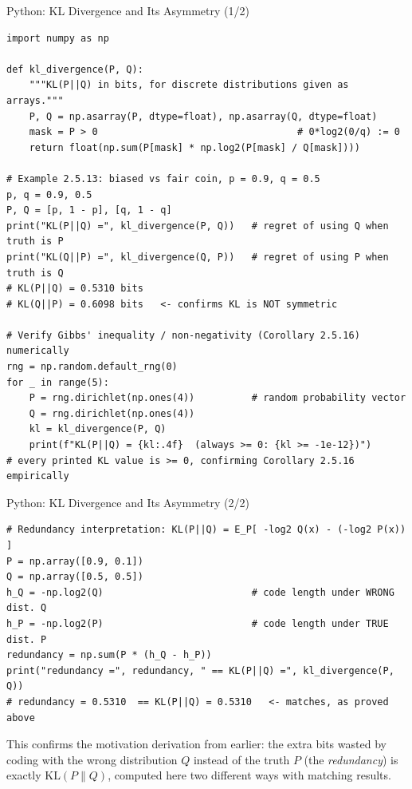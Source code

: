 \documentclass[aspectratio=169,10pt]{beamer}
\begin{document}
\begin{frame}[fragile]{Python: KL Divergence and Its Asymmetry (1/2)}
\begin{lstlisting}[style=python]
import numpy as np

def kl_divergence(P, Q):
    """KL(P||Q) in bits, for discrete distributions given as arrays."""
    P, Q = np.asarray(P, dtype=float), np.asarray(Q, dtype=float)
    mask = P > 0                                   # 0*log2(0/q) := 0
    return float(np.sum(P[mask] * np.log2(P[mask] / Q[mask])))

# Example 2.5.13: biased vs fair coin, p = 0.9, q = 0.5
p, q = 0.9, 0.5
P, Q = [p, 1 - p], [q, 1 - q]
print("KL(P||Q) =", kl_divergence(P, Q))   # regret of using Q when truth is P
print("KL(Q||P) =", kl_divergence(Q, P))   # regret of using P when truth is Q
# KL(P||Q) = 0.5310 bits
# KL(Q||P) = 0.6098 bits   <- confirms KL is NOT symmetric

# Verify Gibbs' inequality / non-negativity (Corollary 2.5.16) numerically
rng = np.random.default_rng(0)
for _ in range(5):
    P = rng.dirichlet(np.ones(4))          # random probability vector
    Q = rng.dirichlet(np.ones(4))
    kl = kl_divergence(P, Q)
    print(f"KL(P||Q) = {kl:.4f}  (always >= 0: {kl >= -1e-12})")
# every printed KL value is >= 0, confirming Corollary 2.5.16 empirically
\end{lstlisting}
\end{frame}

\begin{frame}[fragile]{Python: KL Divergence and Its Asymmetry (2/2)}
\begin{lstlisting}[style=python]
# Redundancy interpretation: KL(P||Q) = E_P[ -log2 Q(x) - (-log2 P(x)) ]
P = np.array([0.9, 0.1])
Q = np.array([0.5, 0.5])
h_Q = -np.log2(Q)                          # code length under WRONG dist. Q
h_P = -np.log2(P)                          # code length under TRUE dist. P
redundancy = np.sum(P * (h_Q - h_P))
print("redundancy =", redundancy, " == KL(P||Q) =", kl_divergence(P, Q))
# redundancy = 0.5310  == KL(P||Q) = 0.5310   <- matches, as proved above
\end{lstlisting}

\medskip
This confirms the motivation derivation from earlier: the extra bits wasted
by coding with the wrong distribution $Q$ instead of the truth $P$ (the
\emph{redundancy}) is exactly $\mathrm{KL}(P\|Q)$, computed here two
different ways with matching results.
\end{frame}
\end{document}
